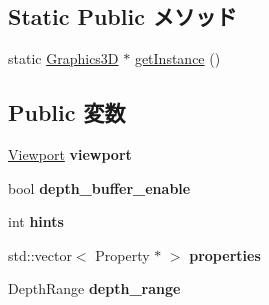 \subsection*{Static Public メソッド}
\begin{CompactItemize}
\item 
static \hyperlink{classm3g_1_1Graphics3D}{Graphics3D} $\ast$ \hyperlink{classm3g_1_1Graphics3D_da6d71754bfe755dd8204a9332e9ed47}{getInstance} ()
\end{CompactItemize}
\subsection*{Public 変数}
\begin{CompactItemize}
\item 
\hypertarget{classm3g_1_1Graphics3D_6a0b80dfc7341ce8102a7cb1688aff0a}{
\hyperlink{structm3g_1_1Graphics3D_1_1Viewport}{Viewport} \textbf{viewport}}
\label{classm3g_1_1Graphics3D_6a0b80dfc7341ce8102a7cb1688aff0a}

\item 
\hypertarget{classm3g_1_1Graphics3D_12e48d234a9d97ae438019a4c44b989c}{
bool \textbf{depth\_\-buffer\_\-enable}}
\label{classm3g_1_1Graphics3D_12e48d234a9d97ae438019a4c44b989c}

\item 
\hypertarget{classm3g_1_1Graphics3D_b557fee5e49a2c2bcdf8803d25b464fb}{
int \textbf{hints}}
\label{classm3g_1_1Graphics3D_b557fee5e49a2c2bcdf8803d25b464fb}

\item 
\hypertarget{classm3g_1_1Graphics3D_c4e9c4de7572c6bdf18ecbba4ff8f97c}{
std::vector$<$ Property $\ast$ $>$ \textbf{properties}}
\label{classm3g_1_1Graphics3D_c4e9c4de7572c6bdf18ecbba4ff8f97c}

\item 
\hypertarget{classm3g_1_1Graphics3D_ac5360336501ffd544f72821c2f3fd3e}{
DepthRange \textbf{depth\_\-range}}
\label{classm3g_1_1Graphics3D_ac5360336501ffd544f72821c2f3fd3e}

\end{CompactItemize}
